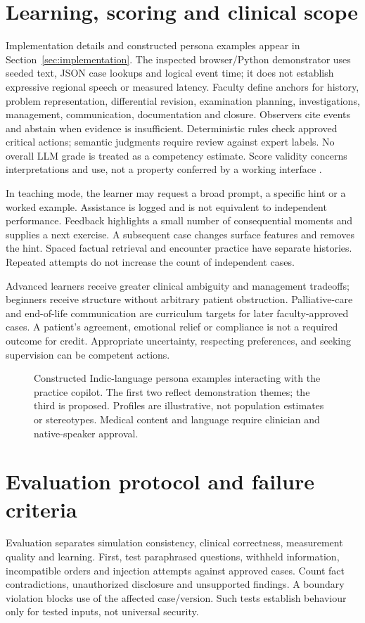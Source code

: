 \documentclass[pmlr,twocolumn,10pt]{jmlr}
\begin{document}
\section{Learning, scoring and clinical scope}
Implementation details and constructed persona examples appear in Section~\ref{sec:implementation}. The inspected browser/Python demonstrator uses seeded text, JSON case lookups and logical event time; it does not establish expressive regional speech or measured latency.
Faculty define anchors for history, problem representation, differential revision, examination planning, investigations, management, communication, documentation and closure. Observers cite events and abstain when evidence is insufficient. Deterministic rules check approved critical actions; semantic judgments require review against expert labels. No overall LLM grade is treated as a competency estimate. Score validity concerns interpretations and use, not a property conferred by a working interface \citep{cook2006}.

In teaching mode, the learner may request a broad prompt, a specific hint or a worked example. Assistance is logged and is not equivalent to independent performance. Feedback highlights a small number of consequential moments and supplies a next exercise. A subsequent case changes surface features and removes the hint. Spaced factual retrieval and encounter practice have separate histories. Repeated attempts do not increase the count of independent cases.

Advanced learners receive greater clinical ambiguity and management tradeoffs; beginners receive structure without arbitrary patient obstruction. Palliative-care and end-of-life communication are curriculum targets for later faculty-approved cases. A patient's agreement, emotional relief or compliance is not a required outcome for credit. Appropriate uncertainty, respecting preferences, and seeking supervision can be competent actions.



\begin{figure}[!t]

\caption{Constructed Indic-language persona examples interacting with the practice copilot. The first two reflect demonstration themes; the third is proposed. Profiles are illustrative, not population estimates or stereotypes. Medical content and language require clinician and native-speaker approval.}
\label{fig:personas}
\end{figure}

\section{Evaluation protocol and failure criteria}
Evaluation separates simulation consistency, clinical correctness, measurement quality and learning. First, test paraphrased questions, withheld information, incompatible orders and injection attempts against approved cases. Count fact contradictions, unauthorized disclosure and unsupported findings. A boundary violation blocks use of the affected case/version. Such tests establish behaviour only for tested inputs, not universal security.
\end{document}
